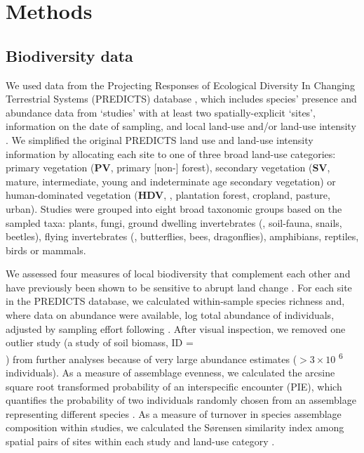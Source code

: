 \section{Methods}
\label{C03_02}
\subsection{Biodiversity data} 
\label{C03_0201}
We used data from the Projecting Responses of Ecological Diversity In Changing Terrestrial Systems (PREDICTS) database \citep{Hudson2016}, which includes species’ presence and abundance data from ‘studies’ with at least two spatially-explicit ‘sites’, information on the date of sampling, and local land-use and/or land-use intensity \citep{Hudson2016}. We simplified the original PREDICTS land use and land-use intensity information \citep{Hudson2014,Hudson2016} by allocating each site to one of three broad land-use categories: primary vegetation (\textbf{PV}, \ie primary [non-] forest), secondary vegetation (\textbf{SV}, \ie mature, intermediate, young and indeterminate age secondary vegetation) or human-dominated vegetation (\textbf{HDV}, \ie, plantation forest, cropland, pasture, urban). Studies were grouped into eight broad taxonomic groups based on the sampled taxa: plants, fungi, ground dwelling invertebrates (\eg, soil-fauna, snails, beetles), flying invertebrates (\eg, butterflies, bees, dragonflies), amphibians, reptiles, birds or mammals. 

We assessed four measures of local biodiversity that complement each other and have previously been shown to be sensitive to abrupt land change \citep{Supp2014,Santini2016}. For each site in the PREDICTS database, we calculated within-sample species richness and, where data on abundance were available, log total abundance of individuals, adjusted by sampling effort following \cite{Newbold2014b}. After visual inspection, we removed one outlier study (a study of soil biomass, ID = \\ ) from further analyses because of very large abundance estimates ($> 3\times 10$ \textsuperscript{6} individuals). As a measure of assemblage evenness, we calculated the arcsine square root transformed probability of an interspecific encounter (PIE), which quantifies the probability of two individuals randomly chosen from an assemblage representing different species \citep{Hurlbert1971}. As a measure of turnover in species assemblage composition within studies, we calculated the S\o rensen similarity index among spatial pairs of sites within each study and land-use category \citep{Magurran2004}.

